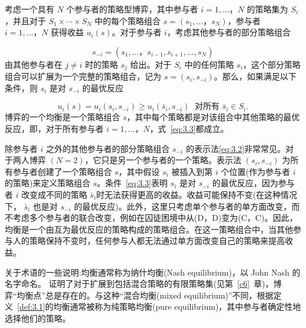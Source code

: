 \begin{definition}\label{def:3.1}
    考虑一个具有 \(N\) 个参与者的策略型博弈，其中参与者 \(i = 1,\ldots，N\) 的策略集为 \({S}_{i}\)，并且对于 \({S}_{1} \times  \cdots  \times  {S}_{N}\) 中的每个策略组合 \(s = \left( {{s}_{1},\ldots，{s}_{N}}\right)\)，参与者 \(i = 1,\ldots，N\) 获得收益 \({u}_{i}\left( s\right)\)。对于参与者 \(i\)，考虑其他参与者的部分策略组合
    
    \begin{equation}\label{eq:3.2}
    {s}_{-i} = \left( {{s}_{1},\ldots，{s}_{i - 1},{s}_{i + 1},\ldots,{s}_{N}}\right) 
    \end{equation}
    由其他参与者在 \(j \neq  i\) 时的策略 \({s}_{j}\) 给出。对于 \({S}_{i}\) 中的任何策略 \({s}_{i}\)，这个部分策略组合可以扩展为一个完整的策略组合，记为 \(s = \left( {{s}_{i},{s}_{-i}}\right)\)。那么，如果满足以下条件，则 \({s}_{i}\) 是对 \({s}_{-i}\) 的最优反应

\begin{equation}\label{eq:3.3}
{u}_{i}\left( s\right)  = {u}_{i}\left( {{s}_{i},{s}_{-i}}\right)  \geq  {u}_{i}\left( {{\bar{s}}_{i},{s}_{-i}}\right) \;\text{ 对所有 }{\bar{s}}_{i} \in  {S}_{i}.  
\end{equation}
博弈的一个均衡是一个策略组合 \(s\)，其中每个策略都是对该组合中其他策略的最优反应，即，对于所有参与者 \(i = 1,\ldots，N\)，式~\eqref{eq:3.3}都成立。
\end{definition}


除参与者 \(i\) 之外的其他参与者的部分策略组合 \({s}_{-i}\) 的表示法\eqref{eq:3.2}非常常见。对于两人博弈 \(\left( {N = 2}\right)\)，它只是另一个参与者的一个策略。表示法 \(\left( {{s}_{i},{s}_{-i}}\right)\) 为所有参与者创建了一个策略组合 \(s\)，其中假设 \({s}_{i}\) 被插入到第 \(i\) 个位置(作为参与者 \(i\) 的策略)来定义策略组合 \(s\)。条件~\eqref{eq:3.3}表明 \({s}_{i}\) 是对 \({s}_{-i}\) 的最优反应，因为参与者 \(i\) 改变成不同的策略 \({\bar{s}}_{i}\)时无法获得更高的收益。收益可能保持不变(在这种情况下， \({\bar{s}}_{i}\) 也是对 \({s}_{-i}\) 的最优反应)。此外，这里只考虑单个参与者的单方面改变，而不考虑多个参与者的联合改变，例如在囚徒困境中从(D，D)变为(C，C)。因此，均衡是一个由互为最优反应的策略构成的策略组合。在这一策略组合中，当其他参与人的策略保持不变时，任何参与人都无法通过单方面改变自己的策略来提高收益。

关于术语的一些说明:均衡通常称为纳什均衡(Nash equilibrium)，以 John Nash 的名字命名。\citet{nash1951} 证明了对于扩展到包括混合策略的有限策略集(见第~\ref{c6}~章)，博弈“均衡点”总是存在的。与这种“混合均衡(mixed equilibrium)”不同，根据定义~\ref{def:3.1}的均衡通常被称为纯策略均衡(pure equilibrium)，其中参与者确定性地选择他们的策略。

